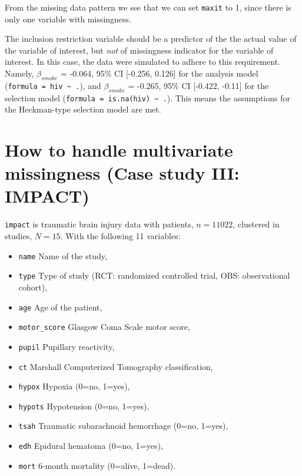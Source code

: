 \documentclass[
]{jss}
\providecommand{\tightlist}{%
  \setlength{\itemsep}{0pt}\setlength{\parskip}{0pt}}
\begin{document}
From the missing data pattern we see that we can set \texttt{maxit} to
1, since there is only one variable with missingness.

The inclusion restriction variable should be a predictor of the the
actual value of the variable of interest, but \emph{not} of missingness
indicator for the variable of interest. In this case, the data were
simulated to adhere to this requirement. Namely, \(\beta_{smoke}\) =
-0.064, 95\% CI {[}-0.256, 0.126{]} for the analysis model
(\texttt{formula\ =\ hiv\ \textasciitilde{}\ .}), and \(\beta_{smoke}\)
= -0.265, 95\% CI {[}-0.422, -0.11{]} for the selection model
(\texttt{formula\ =\ is.na(hiv)\ \textasciitilde{}\ .}). This means the
assumptions for the Heckman-type selection model are met.

\hypertarget{how-to-handle-multivariate-missingness-case-study-iii-impact}{%
\section{How to handle multivariate missingness (Case study III:
IMPACT)}\label{how-to-handle-multivariate-missingness-case-study-iii-impact}}

\texttt{impact} is traumatic brain injury data with patients,
\(n = 11022\), clustered in studies, \(N = 15\). With the following 11
variables:

\begin{itemize}
\tightlist
\item
  \texttt{name} Name of the study,
\item
  \texttt{type} Type of study (RCT: randomized controlled trial, OBS:
  observational cohort),
\item
  \texttt{age} Age of the patient,
\item
  \texttt{motor\_score} Glasgow Coma Scale motor score,
\item
  \texttt{pupil} Pupillary reactivity,
\item
  \texttt{ct} Marshall Computerized Tomography classification,
\item
  \texttt{hypox} Hypoxia (0=no, 1=yes),
\item
  \texttt{hypots} Hypotension (0=no, 1=yes),
\item
  \texttt{tsah} Traumatic subarachnoid hemorrhage (0=no, 1=yes),
\item
  \texttt{edh} Epidural hematoma (0=no, 1=yes),
\item
  \texttt{mort} 6-month mortality (0=alive, 1=dead).
\end{itemize}
\end{document}

